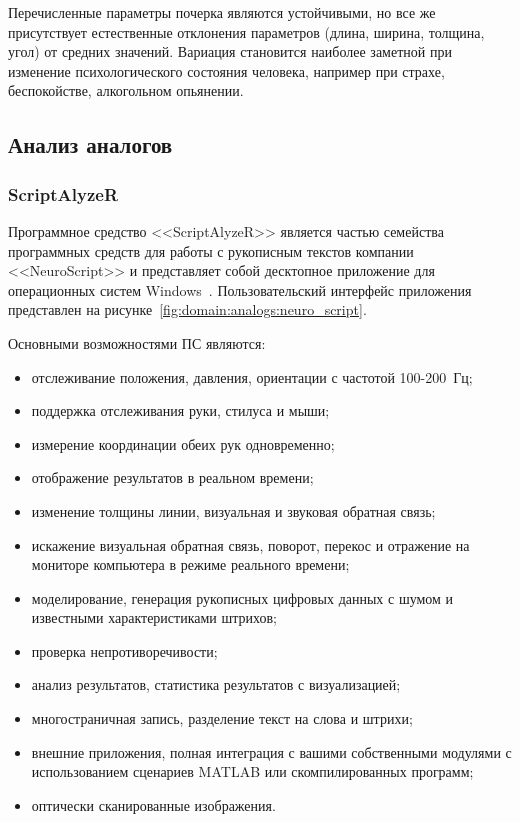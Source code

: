 Перечисленные параметры почерка являются устойчивыми, но все же присутствует естественные отклонения параметров (длина, ширина, толщина, угол) от средних значений. Вариация становится наиболее заметной при изменение психологического состояния человека, например при страхе, беспокойстве, алкогольном опьянении.

\subsection{Анализ аналогов}
\label{sub:domain:analogs}

\subsubsection{ScriptAlyzeR}
\label{sub:domain:analogs:neuro_script} 

Программное средство <<ScriptAlyzeR>> является частью семейства программных средств для работы с рукописным текстов компании <<NeuroScript>> и представляет собой десктопное приложение для операционных систем Windows~\cite{analogs_scriptAlyzer}. Пользовательский интерфейс приложения представлен на рисунке~\ref{fig:domain:analogs:neuro_script}.

Основными возможностями ПС являются:
\begin{itemize}
  \item отслеживание положения, давления, ориентации с частотой \mbox{100-200 Гц;}
	\item поддержка отслеживания руки, стилуса и мыши;
	\item измерение координации обеих рук одновременно;
	\item отображение результатов в реальном времени;
	\item изменение толщины линии, визуальная и звуковая обратная связь;
	\item искажение визуальная обратная связь, поворот, перекос и отражение на мониторе компьютера в режиме реального времени;
	\item моделирование, генерация рукописных цифровых данных с шумом и известными характеристиками штрихов;
	\item проверка непротиворечивости;
	\item анализ результатов, статистика результатов с визуализацией;
	\item многостраничная запись, разделение текст на слова и штрихи;
	\item внешние приложения, полная интеграция с вашими собственными модулями с использованием сценариев MATLAB или скомпилированных программ;
	\item оптически сканированные изображения.
\end{itemize}

